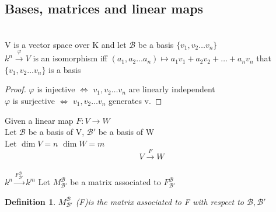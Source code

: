 \documentclass{article}
\newtheorem*{definition}{Definition}
\newcommand\m[1]{\begin{bmatrix}#1\end{bmatrix}}
\newcommand{\as}{a_1,a_2\dots a_n}
\newcommand{\vs}{v_1,v_2\dots v_n}
\newcommand{\brac}[1]{\{#1\}}
\newcommand{\lincom}{a_1v_1+a_2v_2+\dots+a_nv_n}
\newcommand{\li}{linearly independent }
\newenvironment{exercise}[2][Exercise]{\begin{trivlist}
\item[\hskip \labelsep {\bfseries #1}\hskip \labelsep {\bfseries #2.}]}{\end{trivlist}}
\begin{document}
\subsection{Bases, matrices and linear maps}
\\V is a vector space over K and let $\mathcal{B}$ be a basis $\brac{\vs}$
\\$k^n \xrightarrow{\varphi} V$ is an isomorphism iff $(\as) \mapsto \lincom$ that $\brac{\vs}$ is a basis\\
\begin{proof}
    $\varphi$ is injective $\iff$ $\vs$ are \li
\\ $\varphi$ is surjective $\iff $ $\vs $ generates v.
\end{proof}

Given a linear map $F: V \to W$
\\Let $\mathcal{B}$ be a basis of V, $\mathcal{B}'$ be a basis of W\\
Let $\dim V=n$ $\dim W=m$
\\$$V \xrightarrow{F} W$$\\$k^n \xrightarrow{F^\mathcal{B}_{\mathcal{B}'}} k^m$
Let $M^\mathcal{B}_{\mathcal{B}'}$ be a matrix associated to $F^\mathcal{B}_{\mathcal{B}'}$\\
\begin{definition}
    $M^\mathcal{B}_{\mathcal{B}'}$ (F)is the matrix associated to F with respect to $\mathcal{B}, \mathcal{B}'$ 

\end{definition}



$\phantom{k}$
\end{document}
